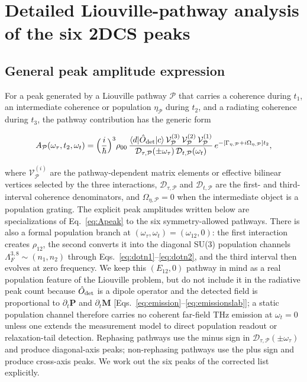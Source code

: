 \documentclass[reprint,amsmath,amssymb,aps,prb,longbibliography]{revtex4-2}
\begin{document}
\section{Detailed Liouville-pathway analysis of the six 2DCS peaks}
\label{sec:2dcs}

\subsection{General peak amplitude expression}

For a peak generated by a Liouville pathway $\mathcal P$ that carries a
coherence during $t_1$, an intermediate coherence or population
$\eta_{\mathcal P}$ during $t_2$, and a radiating coherence during $t_3$,
the pathway contribution has the generic form
\begin{widetext}
\begin{equation}
A_{\mathcal P}(\omega_\tau,t_2,\omega_t) = \Bigl(\frac{i}{\hbar}\Bigr)^3\rho_{00}\,
\frac{\langle d|\hat O_{\rm det}|c\rangle\,\mathcal V^{(3)}_{\mathcal P}\,\mathcal V^{(2)}_{\mathcal P}\,\mathcal V^{(1)}_{\mathcal P}}
{\mathcal D_{\tau,\mathcal P}(\pm\omega_\tau)\,\mathcal D_{t,\mathcal P}(\omega_t)}
\,e^{-[\Gamma_{\eta,\mathcal P}+i\Omega_{\eta,\mathcal P}]t_2},
\label{eq:Apeak}
\end{equation}
\end{widetext}
where $\mathcal V^{(i)}_{\mathcal P}$ are the pathway-dependent matrix
elements or effective bilinear vertices selected by the three
interactions, $\mathcal D_{\tau,\mathcal P}$ and
$\mathcal D_{t,\mathcal P}$ are the first- and third-interval coherence
denominators, and $\Omega_{\eta,\mathcal P}=0$ when the intermediate
object is a population grating. The explicit peak amplitudes written below
are specializations of Eq.~\eqref{eq:Apeak} to the six symmetry-allowed
pathways.
There is also a formal population branch at
$(\omega_\tau,\omega_t)=(\omega_{12},0)$: the first interaction creates
$\rho_{12}$, the second converts it into the diagonal SU(3) population
channels $\Lambda_F^{3,8}\sim(n_1,n_2)$ through
Eqs.~\eqref{eq:dotn1}--\eqref{eq:dotn2}, and the third interval then
evolves at zero frequency. We keep this $(E_{12},0)$ pathway in mind as a
real population feature of the Liouville problem, but do not include it in
the radiative peak count because $\hat O_{\rm det}$ is a dipole operator and
the detected field is proportional to $\partial_t\mathbf P$ and
$\partial_t\mathbf M$ [Eqs.~\eqref{eq:emission}--\eqref{eq:emissionslab}];
a static population channel therefore carries no coherent far-field THz
emission at $\omega_t=0$ unless one extends the measurement model to direct
population readout or relaxation-tail detection.
Rephasing pathways use the minus sign in
$\mathcal D_{\tau,\mathcal P}(\pm\omega_\tau)$ and produce diagonal-axis
peaks; non-rephasing pathways use the plus sign and produce
cross-axis peaks. We work out the six peaks of the corrected list
explicitly.
\end{document}
